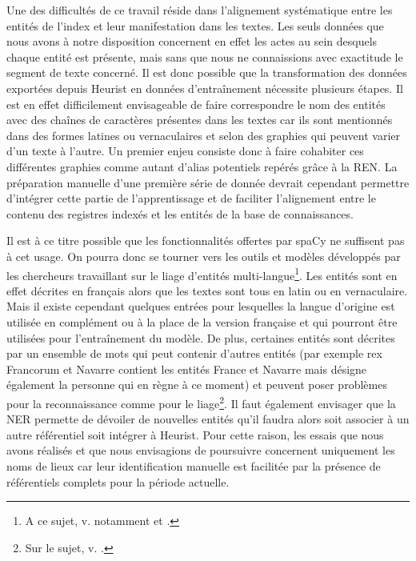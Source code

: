 \documentclass[a4paper,12pt,twoside]{book}
\begin{document}
	Une des difficultés de ce travail réside dans l'alignement systématique entre les entités de l'index et leur manifestation dans les textes. Les seuls données que nous avons à notre disposition concernent en effet les actes au sein desquels chaque entité est présente, mais sans que nous ne connaissions avec exactitude le segment de texte concerné. Il est donc possible que la transformation des données exportées depuis Heurist en données d'entraînement nécessite plusieurs étapes. Il est en effet difficilement envisageable de faire correspondre le nom des entités avec des chaînes de caractères présentes dans les textes car ils sont mentionnés dans des formes latines ou vernaculaires et selon des graphies qui peuvent varier d'un texte à l'autre. Un premier enjeu consiste donc à faire cohabiter ces différentes graphies comme autant d'alias potentiels repérés grâce à la REN. La préparation manuelle d'une première série de donnée devrait cependant permettre d'intégrer cette partie de l'apprentissage et de faciliter l'alignement entre le contenu des registres indexés et les entités de la base de connaissances.
	
	Il est à ce titre possible que les fonctionnalités offertes par spaCy ne suffisent pas à cet usage. On pourra donc se tourner vers les outils et modèles développés par les chercheurs travaillant sur le liage d'entités multi-langue\footnote{A ce sujet, v. notamment \cite{linhares_pontes_linking_2020} et \cite{rijhwani_zero-shot_2019}.}. Les entités sont en effet décrites en français alors que les textes sont tous en latin ou en vernaculaire. Mais il existe cependant quelques entrées pour lesquelles la langue d'origine est utilisée en complément ou à la place de la version française et qui pourront être utilisées pour l'entraînement du modèle. De plus, certaines entités sont décrites par un ensemble de mots qui peut contenir d'autres entités (par exemple \og rex Francorum et Navarre\fg{} contient les entités France et Navarre mais désigne également la personne qui en règne à ce moment) et peuvent poser problèmes pour la reconnaissance comme pour le liage\footnote{Sur le sujet, v. \cite{mcdonough_named_2019}.}. Il faut également envisager que la NER permette de dévoiler de nouvelles entités qu'il faudra alors soit associer à un autre référentiel soit intégrer à Heurist. Pour cette raison, les essais que nous avons réalisés et que nous envisagions de poursuivre concernent uniquement les noms de lieux car leur identification manuelle est facilitée par la présence de référentiels complets pour la période actuelle.
	
\end{document}
